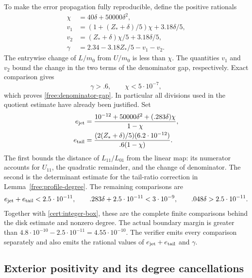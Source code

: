 \documentclass[11pt]{article}
\numberwithin{equation}{section}
\theoremstyle{definition}
\theoremstyle{remark}
\begin{document}
To make the error propagation fully reproducible, define the positive
rationals
\begin{align*}
 \chi&=40\delta+50000\delta^2,\\
 v_1&=(1+(Z_*+\delta)/5)\chi+3.18\delta/5,\\
 v_2&=(Z_*+\delta)\chi/5+3.18\delta/5,\\
 \gamma&=2.34-3.18Z_*/5-v_1-v_2.
\end{align*}
The entrywise change of $L/m_0$ from $U/m_0$ is less than $\chi$.
The quantities $v_1$ and $v_2$ bound the change in the two terms of
the denominator gap, respectively.  Exact comparison gives
\[
 \gamma>.6,\qquad \chi<5\cdot10^{-7},
\]
which proves \eqref{free:denominator-gap}.  In particular all divisions
used in the quotient estimate have already been justified.
Set
\begin{align}\label{cert:ratio-errors}
 e_{\rm jet}&=
 \frac{10^{-12}+50000\delta^2+(.283\delta)\chi}{1-\chi},\notag\\
 e_{\rm tail}&=
 \frac{(2(Z_*+\delta)/5)(6.2\cdot10^{-12})}{.6(1-\chi)}.
\end{align}
The first bounds the distance of $L_{11}/L_{01}$ from the linear map:
its numerator accounts for $U_{11}$, the quadratic remainder, and
the change of denominator.  The second is the determinant estimate
for the tail-ratio correction in Lemma~\ref{free:profile-degree}.
The remaining comparisons are
\begin{equation}\label{cert:degree-comparisons}
 e_{\rm jet}+e_{\rm tail}<2.5\cdot10^{-11},\qquad
 .283\delta+2.5\cdot10^{-11}<3\cdot10^{-9},\qquad
 .048\delta>2.5\cdot10^{-11}.
\end{equation}
Together with \eqref{cert:integer-box}, these are the complete finite
comparisons behind the disk estimate and nonzero degree.  The actual
boundary margin is greater than
$4.8\cdot10^{-10}-2.5\cdot10^{-11}=4.55\cdot10^{-10}$.
The verifier emits every comparison separately and also emits the
rational values of $e_{\rm jet}+e_{\rm tail}$ and $\gamma$.

\subsection{Exterior positivity and its degree cancellations}\label{cert:exterior}
\end{document}
